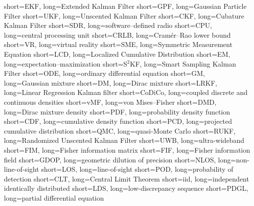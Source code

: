 		{short={EKF},	    	    long={Extended Kalman Filter}}
		{short={GPF},	    	long={Gaussian Particle Filter}}
		{short={UKF},	    	    long={Unscented Kalman Filter}}
		{short={CKF},	    	long={Cubature Kalman Filter}}
		{short={SDR},	    	    long={software--defined radio}}
		{short={CPU},	    	    long={central processing unit}}
		{short={CRLB},	    	  long={Cramér--Rao lower bound}}
		  {short={VR},	    	    long={virtual reality}}
		{short={SME},	    	    long={Symmetric Measurement Equation}}
		{short={LCD},	    	    long={Localized Cumulative Distribution}}
	    {short={EM},	    	    long={expectation--maximization}}
	  {short={S$^2$KF},	      long={Smart Sampling Kalman Filter}}
	  {short={ODE},	    	    long={ordinary differential equation}}
	    {short={GM},	    	    long={Gaussian mixture}}
	    {short={DM},	    	    long={Dirac mixture}}
	  {short={LRKF},	    	  long={Linear Regression Kalman filter}}
	{short={CoDiCo},	      long={coupled discrete and continuous densities}} 
		{short={vMF},	    	    long={von Mises--Fisher}}
		{short={DMD},	    	    long={Dirac mixture density}}
		{short={PDF},	    	    long={probability density function}}
		{short={CDF},	    	    long={cumulative density function}}
		{short={PCD},	    	    long={projected cumulative distribution}}
		{short={QMC},	    	    long={quasi-Monte Carlo}}
		{short={RUKF},	    	  long={Randomized Unscented Kalman Filter}}
		{short={UWB},	    	    long={ultra-wideband}}
		{short={FIM},	    	    long={Fisher information matrix}}
		{short={FIF},	    	    long={Fisher information field}}
		{short={GDOP},	    	  long={geometric dilution of precision}}
		{short={NLOS},	    	  long={non-line-of-sight}}
		{short={LOS},	    	    long={line-of-sight}}
		{short={POD},	    	    long={probability of detection}}
		{short={CLT},	    	    long={Central Limit Theorem}}
		{short={iid},	    	long={independent identically distributed}}
		{short={LDS},	    	long={low-discrepancy sequence}}
		{short={PDGL},	    	long={partial differential equation}}



